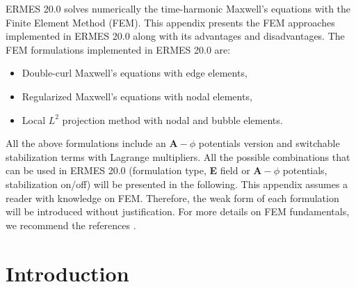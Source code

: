%
%

ERMES 20.0 solves numerically the time-harmonic Maxwell's equations with the Finite Element Method (FEM). This appendix presents the FEM approaches implemented in ERMES 20.0 along with its advantages and disadvantages. The FEM formulations implemented in ERMES 20.0 are: 
\begin{itemize}
	\itemsep0em 
	\item Double-curl Maxwell's equations with edge elements,
	\item Regularized Maxwell's equations with nodal elements,
	\item Local $L^{2}$ projection method with nodal and bubble elements.
\end{itemize}
All the above formulations include an $\textbf{A}-\phi$ potentials version and switchable stabilization terms with Lagrange multipliers. All the possible combinations that can be used in ERMES 20.0 (formulation type, \textbf{E} field or $\textbf{A}-\phi$ potentials, stabilization on/off) will be presented in the following. This appendix assumes a reader with knowledge on FEM. Therefore, the weak form of each formulation will be introduced without justification. For more details on FEM fundamentals, we recommend the references \cite{Jin, Monk, LuisGarcia, Ferrari, Johnson, Zienkiewicz}.

\section{Introduction}\label{FEMIntro}

